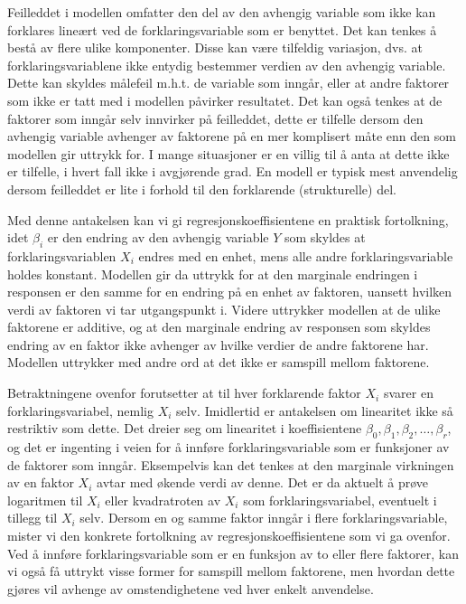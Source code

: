 Feilleddet i modellen omfatter den del av den avhengig variable som ikke kan forklares
lineært ved de forklaringsvariable som er benyttet.  Det kan tenkes å
bestå av flere ulike komponenter.  Disse kan være tilfeldig variasjon,
dvs. at forklaringsvariablene ikke entydig bestemmer verdien av den avhengig
variable.  Dette kan skyldes målefeil m.h.t. de variable som inngår,
eller at andre faktorer som ikke er tatt med i mo\-dellen påvirker
resultatet.  Det kan også tenkes at de faktorer som inngår selv innvirker på
feilleddet,  dette er tilfelle dersom den avhengig variable avhenger av
faktorene på en mer komplisert måte enn den som modellen gir uttrykk
for.  I mange situasjoner er en villig til å anta at dette ikke er
tilfelle, i hvert fall ikke i avgjørende grad.
En modell er typisk mest anvendelig dersom feilleddet er lite i forhold til
den forklarende (strukturelle) del.

Med denne antakelsen kan vi gi regresjonskoeffisientene en praktisk 
fortolkning, idet ${\beta}_i$ er den endring av den avhengig variable $Y$
som skyldes at forklaringsvariablen $X_i$ endres med en enhet, mens alle 
andre forkla\-ringsvariable holdes konstant.  Modellen gir da uttrykk for at
den marginale endringen i responsen er den samme for en endring på en
enhet av faktoren, uansett hvilken verdi av faktoren vi tar utgangspunkt i.
Videre uttrykker modellen at de ulike faktorene er additive, og at den
marginale endring av responsen som skyldes endring av en faktor ikke avhenger
av hvilke verdier de andre faktorene har.  Modellen uttrykker med andre ord
at det ikke er samspill mellom faktorene.

Betraktningene ovenfor forutsetter at til hver forklarende faktor $X_i$ svarer en
forklaringsvariabel, nemlig $X_i$ selv.  Imidlertid er antakelsen om 
linearitet ikke så restriktiv som dette.  Det dreier seg om linearitet i
koeffisientene ${\beta}_0, {\beta}_1, {\beta}_2, \ldots , {\beta}_r $, og det
er ingenting i veien for å innføre for\-klaringsvariable som er funksjoner
av de faktorer som inngår.  Eksempelvis kan det tenkes at den marginale
virkningen av en faktor $X_i$ avtar med økende verdi av denne. Det er da
aktuelt å prøve logaritmen til $X_i$ eller kvadratroten av $X_i$ som
forklaringsvariabel, eventuelt i tillegg til $X_i$ selv.  Dersom en og samme
faktor inngår i flere forklaringsvariable, mister vi den konkrete
fortolkning av regresjonskoeffisientene som vi ga ovenfor.  Ved å 
innføre forklaringsvariable som er en funksjon av to eller flere faktorer,
kan vi også få uttrykt visse former for samspill mellom faktorene,
men hvordan dette gjøres vil avhenge av omstendighetene ved hver enkelt
anvendelse.

